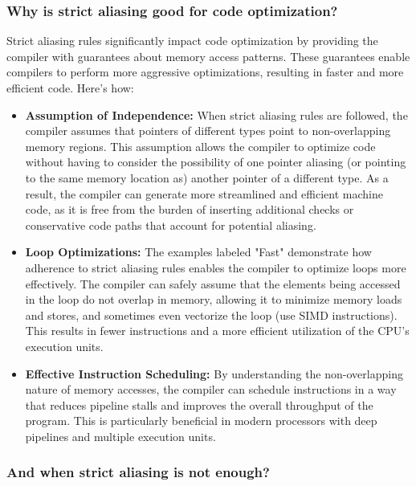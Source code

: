 \documentclass[12pt]{article}
\begin{document}
\subsubsection{Why is strict aliasing good for code optimization?}

Strict aliasing rules significantly impact code optimization by providing the compiler with guarantees about memory access patterns. These guarantees enable compilers to perform more aggressive optimizations, resulting in faster and more efficient code. Here's how:

\begin{itemize}
    \item \textbf{Assumption of Independence:} When strict aliasing rules are followed, the compiler assumes that pointers of different types point to non-overlapping memory regions. This assumption allows the compiler to optimize code without having to consider the possibility of one pointer aliasing (or pointing to the same memory location as) another pointer of a different type. As a result, the compiler can generate more streamlined and efficient machine code, as it is free from the burden of inserting additional checks or conservative code paths that account for potential aliasing.

    \item \textbf{Loop Optimizations:} The examples labeled "Fast" demonstrate how adherence to strict aliasing rules enables the compiler to optimize loops more effectively. The compiler can safely assume that the elements being accessed in the loop do not overlap in memory, allowing it to minimize memory loads and stores, and sometimes even vectorize the loop (use SIMD instructions). This results in fewer instructions and a more efficient utilization of the CPU's execution units.

    \item \textbf{Effective Instruction Scheduling:} By understanding the non-overlapping nature of memory accesses, the compiler can schedule instructions in a way that reduces pipeline stalls and improves the overall throughput of the program. This is particularly beneficial in modern processors with deep pipelines and multiple execution units.

\end{itemize}

\subsubsection{And when strict aliasing is not enough?}
\end{document}
